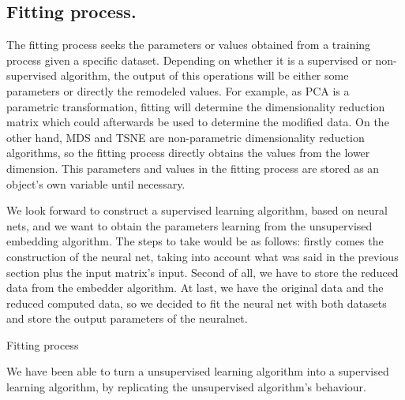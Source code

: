 \documentclass[a4paper,11pt,spanish]{report}
\makeatletter
\def\BState{\State\hskip-\ALG@thistlm}
\makeatother
\begin{document}
\subsection{Fitting process.}
\label{ssec:fit}

The fitting process seeks the parameters or values obtained from a training process given a specific dataset. Depending on whether it is a supervised or non-supervised algorithm, the output of this operations will be either some parameters or directly the remodeled values. For example, as PCA is a parametric transformation, fitting will determine the dimensionality reduction matrix which could afterwards be used to determine the modified data. On the other hand, MDS and TSNE are non-parametric dimensionality reduction algorithms, so the fitting process directly obtains the values from the lower dimension. This parameters and values in the fitting process are stored as an object's own variable until necessary.

We look forward to construct a supervised learning algorithm, based on neural nets, and we want to obtain the parameters learning from the unsupervised embedding algorithm. The steps to take would be as follows: firstly comes the construction of the neural net, taking into account what was said in the previous section plus the input matrix's input. Second of all, we have to store the reduced data from the embedder algorithm. At last, we have the original data and the reduced computed data, so we decided to fit the neural net with both datasets and store the output parameters of the neuralnet.
\vspace{10pt}

\begin{algorithm}
\caption{Fitting process}
\end{algorithm}

We have been able to turn a unsupervised learning algorithm into a supervised learning algorithm, by replicating the unsupervised algorithm's behaviour.
\end{document}
